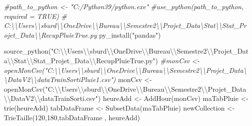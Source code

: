 \documentclass[
]{article}
\newenvironment{Shaded}{\begin{snugshade}}{\end{snugshade}}
\newcommand{\CommentTok}[1]{\textcolor[rgb]{0.56,0.35,0.01}{\textit{#1}}}
\newcommand{\DecValTok}[1]{\textcolor[rgb]{0.00,0.00,0.81}{#1}}
\newcommand{\FunctionTok}[1]{\textcolor[rgb]{0.00,0.00,0.00}{#1}}
\newcommand{\NormalTok}[1]{#1}
\newcommand{\OtherTok}[1]{\textcolor[rgb]{0.56,0.35,0.01}{#1}}
\newcommand{\SpecialCharTok}[1]{\textcolor[rgb]{0.00,0.00,0.00}{#1}}
\newcommand{\StringTok}[1]{\textcolor[rgb]{0.31,0.60,0.02}{#1}}
\begin{document}
\begin{Shaded}
\begin{Highlighting}[]
\CommentTok{\#path\_to\_python \textless{}{-} "C:/Python39/python.exe"}
\CommentTok{\#use\_python(path\_to\_python, required = TRUE)}
\CommentTok{\# C:\textbackslash{}\textbackslash{}Users\textbackslash{}\textbackslash{}sburd\textbackslash{}\textbackslash{}OneDrive\textbackslash{}\textbackslash{}Bureau\textbackslash{}\textbackslash{}Semestre2\textbackslash{}\textbackslash{}Projet\_Data\textbackslash{}Stat\textbackslash{}\textbackslash{}Stat\_Projet\_Data\textbackslash{}\textbackslash{}RecupPluieTrue.py}
\FunctionTok{py\_install}\NormalTok{(}\StringTok{"pandas"}\NormalTok{)}

\FunctionTok{source\_python}\NormalTok{(}\StringTok{"C:}\SpecialCharTok{\textbackslash{}\textbackslash{}}\StringTok{Users}\SpecialCharTok{\textbackslash{}\textbackslash{}}\StringTok{sburd}\SpecialCharTok{\textbackslash{}\textbackslash{}}\StringTok{OneDrive}\SpecialCharTok{\textbackslash{}\textbackslash{}}\StringTok{Bureau}\SpecialCharTok{\textbackslash{}\textbackslash{}}\StringTok{Semestre2}\SpecialCharTok{\textbackslash{}\textbackslash{}}\StringTok{Projet\_Data}\SpecialCharTok{\textbackslash{}\textbackslash{}}\StringTok{Stat}\SpecialCharTok{\textbackslash{}\textbackslash{}}\StringTok{Stat\_Projet\_Data}\SpecialCharTok{\textbackslash{}\textbackslash{}}\StringTok{RecupPluieTrue.py"}\NormalTok{)}
\CommentTok{\#monCsv \textless{}{-} openMonCsv("C:\textbackslash{}\textbackslash{}Users\textbackslash{}\textbackslash{}sburd\textbackslash{}\textbackslash{}OneDrive\textbackslash{}\textbackslash{}Bureau\textbackslash{}\textbackslash{}Semestre2\textbackslash{}\textbackslash{}Projet\_Data\textbackslash{}\textbackslash{}DataV2\textbackslash{}\textbackslash{}dataTrainSortiPluie1.csv")}
\NormalTok{monCsv }\OtherTok{\textless{}{-}} \FunctionTok{openMonCsv}\NormalTok{(}\StringTok{"C:}\SpecialCharTok{\textbackslash{}\textbackslash{}}\StringTok{Users}\SpecialCharTok{\textbackslash{}\textbackslash{}}\StringTok{sburd}\SpecialCharTok{\textbackslash{}\textbackslash{}}\StringTok{OneDrive}\SpecialCharTok{\textbackslash{}\textbackslash{}}\StringTok{Bureau}\SpecialCharTok{\textbackslash{}\textbackslash{}}\StringTok{Semestre2}\SpecialCharTok{\textbackslash{}\textbackslash{}}\StringTok{Projet\_Data}\SpecialCharTok{\textbackslash{}\textbackslash{}}\StringTok{DataV2}\SpecialCharTok{\textbackslash{}\textbackslash{}}\StringTok{dataTrainSorti.csv"}\NormalTok{)}
\NormalTok{heureAdd }\OtherTok{\textless{}{-}} \FunctionTok{AddHour}\NormalTok{(monCsv)}
\NormalTok{maTabPluie }\OtherTok{\textless{}{-}} \FunctionTok{trie}\NormalTok{(heureAdd)}
\NormalTok{tabDataFrame }\OtherTok{\textless{}{-}} \FunctionTok{SubsetData}\NormalTok{(maTabPluie)}
\NormalTok{newCollection }\OtherTok{\textless{}{-}} \FunctionTok{TrieTaille}\NormalTok{(}\DecValTok{120}\NormalTok{,}\DecValTok{180}\NormalTok{,tabDataFrame , heureAdd)}
\end{Highlighting}
\end{Shaded}
\end{document}
